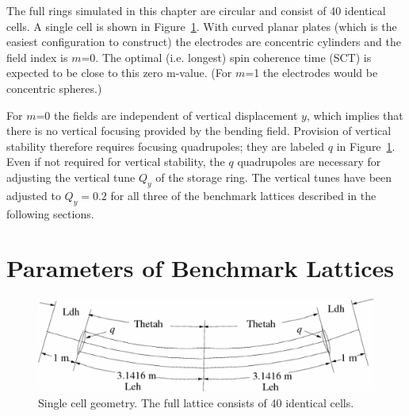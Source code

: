 \documentclass[12pt]{article}
\begin{document}
The full rings simulated in this chapter are circular and consist of 40 identical cells. 
A single cell is shown in Figure~\ref{fig:E_benchmark}. With curved planar plates (which is 
the easiest configuration to construct) the electrodes are
concentric cylinders and the field index is $m$=0. The 
optimal (i.e. longest) spin coherence time (SCT) is expected to be close 
to this zero m-value. (For $m$=1 the electrodes would be concentric spheres.)

For $m$=0 the fields are independent of vertical displacement $y$,
which implies that there is no vertical focusing provided by the bending field.
Provision of vertical stability therefore requires 
focusing quadrupoles; they are labeled $q$ in Figure~\ref{fig:E_benchmark}.
Even if not required for vertical stability, the $q$ quadrupoles are 
necessary for adjusting the vertical tune $Q_y$ of the storage ring.
The vertical tunes have been adjusted to $Q_y=0.2$ for all three of
the benchmark lattices described in the following sections.

\section{Parameters of Benchmark Lattices}
%
\begin{figure}[h]
\centering
\includegraphics[scale=0.5]{pdf/E_benchmark-latt.pdf}
\caption{\label{fig:E_benchmark}Single cell geometry. The full lattice consists
of 40 identical cells.}
\end{figure}
%
\end{document}

